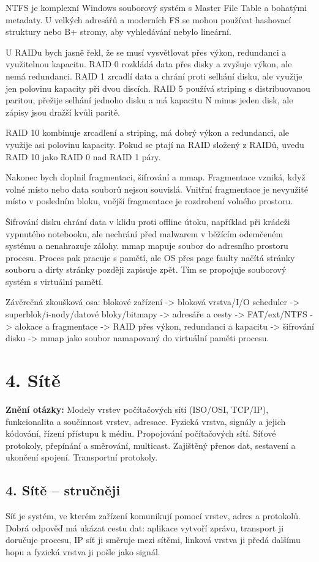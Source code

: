 \documentclass[11pt,a4paper]{article}
\newcommand{\otazka}[3]{\section*{#1}\addcontentsline{toc}{section}{#1}\noindent\textbf{Znění otázky:} #2\par\medskip}
\begin{document}
NTFS je komplexní Windows souborový systém s Master File Table a bohatými metadaty. U velkých adresářů a moderních FS se mohou používat hashovací struktury nebo B+ stromy, aby vyhledávání nebylo lineární.

U RAIDu bych jasně řekl, že se musí vysvětlovat přes výkon, redundanci a využitelnou kapacitu. RAID 0 rozkládá data přes disky a zvyšuje výkon, ale nemá redundanci. RAID 1 zrcadlí data a chrání proti selhání disku, ale využije jen polovinu kapacity při dvou discích. RAID 5 používá striping s distribuovanou paritou, přežije selhání jednoho disku a má kapacitu N minus jeden disk, ale zápisy jsou dražší kvůli paritě.

RAID 10 kombinuje zrcadlení a striping, má dobrý výkon a redundanci, ale využije asi polovinu kapacity. Pokud se ptají na RAID složený z RAIDů, uvedu RAID 10 jako RAID 0 nad RAID 1 páry.

Nakonec bych doplnil fragmentaci, šifrování a mmap. Fragmentace vzniká, když volné místo nebo data souborů nejsou souvislá. Vnitřní fragmentace je nevyužité místo v posledním bloku, vnější fragmentace je rozdrobení volného prostoru.

Šifrování disku chrání data v klidu proti offline útoku, například při krádeži vypnutého notebooku, ale nechrání před malwarem v běžícím odemčeném systému a nenahrazuje zálohy. mmap mapuje soubor do adresního prostoru procesu. Proces pak pracuje s pamětí, ale OS přes page faulty načítá stránky souboru a dirty stránky později zapisuje zpět. Tím se propojuje souborový systém s virtuální pamětí.

Závěrečná zkoušková osa: blokové zařízení -> bloková vrstva/I/O scheduler -> superblok/i-nody/datové bloky/bitmapy -> adresáře a cesty -> FAT/ext/NTFS -> alokace a fragmentace -> RAID přes výkon, redundanci a kapacitu -> šifrování disku -> mmap jako soubor namapovaný do virtuální paměti procesu.

\newpage

\otazka{4. Sítě}{Modely vrstev počítačových sítí (ISO/OSI, TCP/IP), funkcionalita a součinnost vrstev, adresace. Fyzická vrstva, signály a jejich kódování, řízení přístupu k médiu. Propojování počítačových sítí. Síťové protokoly, přepínání a směrování, multicast. Zajištěný přenos dat, sestavení a ukončení spojení. Transportní protokoly.}{PB156, PB156cv}

\subsection*{4. Sítě -- stručněji}
Síť je systém, ve kterém zařízení komunikují pomocí vrstev, adres a protokolů. Dobrá odpověď má ukázat cestu dat: aplikace vytvoří zprávu, transport ji doručuje procesu, IP síť ji směruje mezi sítěmi, linková vrstva ji předá dalšímu hopu a fyzická vrstva ji pošle jako signál.
\end{document}
